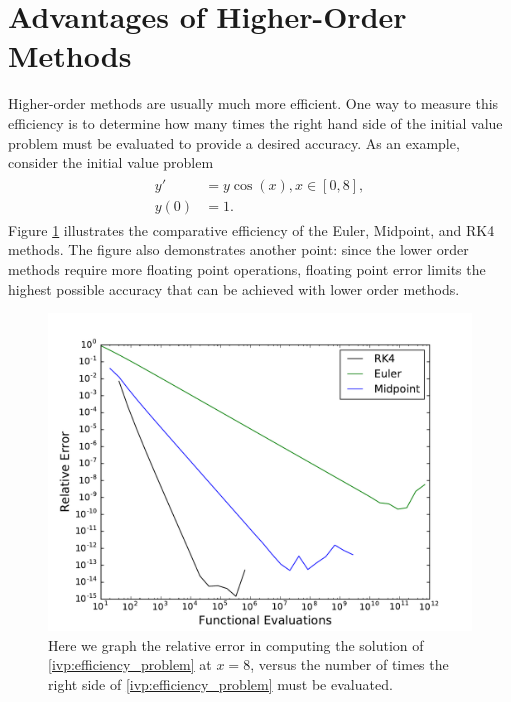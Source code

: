 \section*{Advantages of Higher-Order Methods} 

Higher-order methods are usually much more efficient. One way to measure this efficiency is to determine how many times the right hand side of the initial value problem must be evaluated to provide a desired accuracy.  As an example, consider the initial value problem 
\begin{align}
	\begin{split}
		y' &= y \cos(x), x \in [0,8],\\
		y(0) &= 1. 
	\end{split}
	\label{ivp:efficiency_problem}
\end{align}
Figure \ref{ivp:efficiency_figure} illustrates the comparative efficiency of the Euler, Midpoint, and RK4 methods.  The figure also demonstrates another point: since the lower order methods require more floating point operations, floating point error limits the highest possible accuracy that can be achieved with lower order methods. 

\begin{figure}[ht]
\centering
\includegraphics[width=\textwidth]{Efficiency.pdf}
\caption{Here we graph the relative error in computing the solution of \eqref{ivp:efficiency_problem} at $x = 8$, versus the number of times the right side of \eqref{ivp:efficiency_problem} must be evaluated.  }
\label{ivp:efficiency_figure}
\end{figure}




